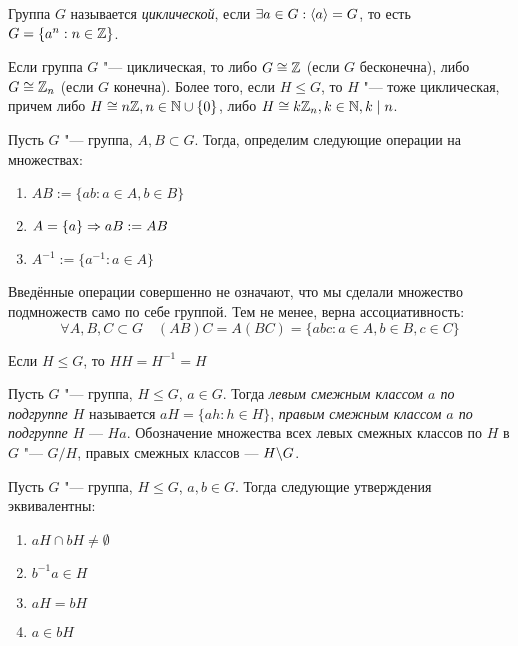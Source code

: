 \begin{definition}
	Группа $G$ называется \textit{циклической}, если $\exists a \hm\in G: \langle a\rangle = G$, то есть $G = \{a^n: n \in \mathbb{Z}\}$.
\end{definition}

\begin{reminder}
	Если группа $G$ "--- циклическая, то либо $G \cong \mathbb{Z}$ (если $G$ бесконечна), либо $G \cong \mathbb{Z}_n$ (если $G$ конечна). Более того, если $H \le G$, то $H$ "--- тоже циклическая, причем либо $H \cong n\mathbb{Z}, n \in \mathbb{N}\cup\{0\}$, либо $H \cong k\mathbb{Z}_n, k \in \mathbb{N}, k\mid n$.
\end{reminder}

\begin{definition}
	Пусть $G$ "--- группа, $A, B \subset G$. Тогда, определим следующие операции на множествах:
	\begin{enumerate}
		\item $AB := \{ab: a \in A, b \in B\}$
		
		\item $A = \{a\} \Rightarrow aB := AB$
		
		\item $A^{-1} := \{a^{-1}: a \in A\}$
	\end{enumerate}
\end{definition}

\begin{note}
	Введённые операции совершенно не означают, что мы сделали множество подмножеств само по себе группой. Тем не менее, верна ассоциативность:
	\[
		\forall A, B, C \subset G \quad (AB)C = A(BC) = \{abc \colon a \in A, b \in B, c \in C\}
	\]
\end{note}

\begin{note}
	Если $H \le G$, то $HH = H^{-1} = H$
\end{note}

\begin{definition}
	Пусть $G$ "--- группа, $H \le G$, $a \in G$. Тогда \textit{левым смежным классом $a$ по подгруппе $H$} называется $aH = \{ah: h \in H\}$, \textit{правым смежным классом $a$ по подгруппе $H$} --- $Ha$. Обозначение множества всех левых смежных классов по $H$ в $G$ "--- $G/H$, правых смежных классов --- $H\backslash G$.
\end{definition}

\begin{proposition}
	Пусть $G$ "--- группа, $H \le G$, $a, b \in G$. Тогда следующие утверждения эквивалентны:
	\begin{enumerate}
		\item $aH \cap bH \neq \emptyset$
		
		\item $b^{-1}a \in H$
		
		\item $aH = bH$
		
		\item $a \in bH$
	\end{enumerate}
\end{proposition}

